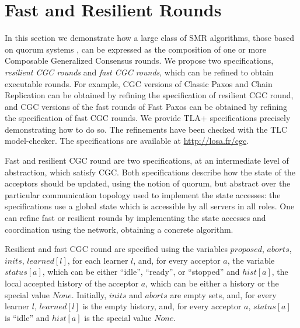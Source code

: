 \documentclass{llncs}
\begin{document}
\section{Fast and Resilient Rounds}
\label{sec:rounds}

In this section we demonstrate how a large class of SMR algorithms, those based on quorum systems \cite{GuerraouiVukolic10RefinedQuorumSystems}, can be expressed as the composition of one or more Composable Generalized Consensus rounds. 
We propose two specifications, \emph{resilient CGC
rounds} and \emph{fast CGC rounds}, which can be refined to obtain executable rounds.
For example, CGC versions of Classic Paxos and Chain
Replication can be obtained by refining the specification of
resilient CGC round, and CGC versions of the fast rounds of Fast Paxos can be obtained by refining the specification of fast CGC rounds.
We provide TLA+ specifications precisely demonstrating how to do so. The refinements have been checked with the TLC model-checker.
The specifications are available at \url{http://losa.fr/cgc}.

Fast and resilient CGC round are two specifications, at an
intermediate level of abstraction, which satisfy CGC\@. Both
specifications describe how the state of the acceptors should be
updated, using the notion of quorum, but abstract over the particular communication topology used
to implement the state accesses: the specifications use a global state
which is accessible by all servers in all roles. One can refine fast
or resilient rounds by implementing the state accesses and coordination
using the network, obtaining a concrete algorithm.

Resilient and fast CGC round are specified using the variables $proposed$, $aborts$, $inits$, $learned\left[ l \right]$, for each learner $l$, 
and, for every acceptor $a$, the variable
$status\left[ a \right]$, which can be either ``idle'', ``ready'', or
``stopped'' and $hist\left[ a \right]$, the local accepted history of the
acceptor $a$, which can be either a history or the special value $None$.
Initially, $inits$ and $aborts$ are empty sets, and, for every learner
$l$, $learned\left[ l \right]$ is the empty history, and, for every acceptor $a$,
$status\left[ a \right]$  is ``idle'' and $hist\left[ a \right]$ is the special
value $None$.
\end{document}
